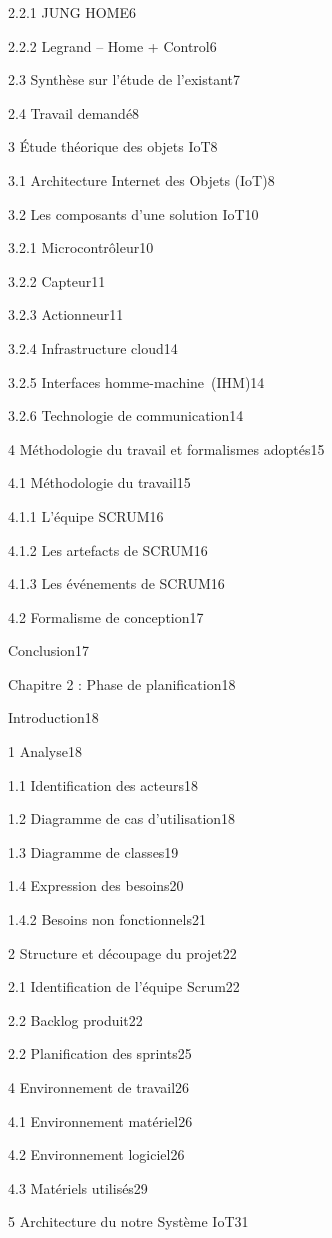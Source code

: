 \documentclass{article}
\begin{document}
2.2.1 JUNG HOME6

2.2.2 Legrand – Home + Control6

2.3 Synthèse sur l’étude de l’existant7

2.4 Travail demandé8

3 Étude théorique des objets IoT8

3.1 Architecture Internet des Objets (IoT)8

3.2 Les composants d’une solution IoT10

3.2.1 Microcontrôleur10

3.2.2 Capteur11

3.2.3 Actionneur11

3.2.4 Infrastructure cloud14

3.2.5 Interfaces homme-machine (IHM)14

3.2.6  Technologie de communication14

4 Méthodologie du travail et formalismes adoptés15

4.1 Méthodologie du travail15

4.1.1 L’équipe SCRUM16

4.1.2 Les artefacts de SCRUM16

4.1.3  Les événements de SCRUM16

4.2 Formalisme de conception17

Conclusion17

Chapitre 2 : Phase de planification18

Introduction18

1 Analyse18

1.1 Identification des acteurs18

1.2 Diagramme de cas d’utilisation18

1.3 Diagramme de classes19

1.4 Expression des besoins20

1.4.2 Besoins non fonctionnels21

2 Structure et découpage du projet22

2.1 Identification de l’équipe Scrum22

2.2 Backlog produit22

2.2 Planification des sprints25

4 Environnement de travail26

4.1 Environnement matériel26

4.2 Environnement logiciel26

4.3 Matériels utilisés29

5  Architecture  du  notre  Système  IoT31
\end{document}
